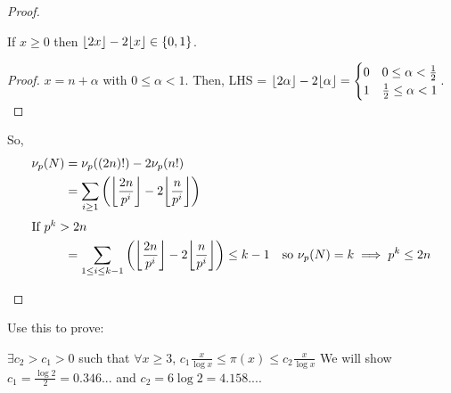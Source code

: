 \documentclass{article}
\DeclarePairedDelimiter\floor{\lfloor}{\rfloor}
\begin{document}
\begin{proof}
\begin{enumerate}[label=(\roman*)]
            \begin{lemma}
                If $x \geq 0$ then $\floor{2x} - 2 \floor{x} \in \{0, 1\}$.
            \end{lemma}
            \begin{proof}
                $x = n + \alpha$ with $0 \leq \alpha < 1$.
                Then, LHS = $\floor{2\alpha} - 2 \floor{\alpha} = \begin{cases}0 & 0 \leq \alpha < \frac{1}{2} \\ 1 & \frac{1}{2} \leq \alpha < 1\end{cases}.$
            \end{proof}
            So,
            \begin{align*}
                \nu_p(N) &= \nu_p((2n)!) - 2 \nu_p(n!) \\
                         &= \sum_{i \geq 1} \left(\floor*{\frac{2n}{p^i}} - 2 \floor*{\frac{n}{p^i}}\right) \\
                \shortintertext{If $p^k > 2n$}
                &= \sum_{1 \leq i \leq k-1} \left(\floor*{\frac{2n}{p^i}} - 2 \floor*{\frac{n}{p^i}}\right) \leq k-1 \quad \text{so } \nu_p(N) = k \implies p^k \leq 2n
            \end{align*}
    \end{enumerate}
\end{proof}

Use this to prove:
\begin{nthm}\label{thm:5.8}
    $\exists c_2 > c_1 > 0$ such that $\forall x \geq 3$, $c_1 \frac{x}{\log x} \leq \pi(x) \leq c_2 \frac{x}{\log x}$
    We will show $c_1 = \frac{\log 2}{2} = 0.346...$ and $c_2 = 6 \log 2 = 4.158...$.
\end{nthm}
\end{document}
